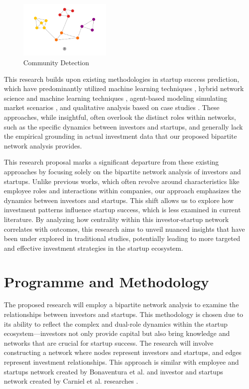 \documentclass[a4paper,11pt]{article}
\begin{document}
\begin{figure}[h]
\centering
\includegraphics[width=0.4\textwidth]{community.png}
\caption{Community Detection}
\end{figure}

This research builds upon existing methodologies in startup success prediction, which have predominantly utilized machine learning techniques \cite{krishna2016a} \cite{sharchilev2018a}, hybrid network science and machine learning techniques \cite{carniel2023a} \cite{yang2020a}, agent-based modeling simulating market scenarios \cite{lengyel2020a}, and qualitative analysis based on case studies \cite{mccarthy2023a}. These approaches, while insightful, often overlook the distinct roles within networks, such as the specific dynamics between investors and startups, and generally lack the empirical grounding in actual investment data that our proposed bipartite network analysis provides.

This research proposal marks a significant departure from these existing approaches by focusing solely on the bipartite network analysis of investors and startups. Unlike previous works, which often revolve around characteristics like employee roles and interactions within companies, our approach emphasizes the dynamics between investors and startups. This shift allows us to explore how investment patterns influence startup success, which is less examined in current literature. By analyzing how centrality within this investor-startup network correlates with outcomes, this research aims to unveil nuanced insights that have been under explored in traditional studies, potentially leading to more targeted and effective investment strategies in the startup ecosystem.

\section{Programme and Methodology}
The proposed research will employ a bipartite network analysis to examine the relationships between investors and startups. This methodology is chosen due to its ability to reflect the complex and dual-role dynamics within the startup ecosystem—investors not only provide capital but also bring knowledge and networks that are crucial for startup success. The research will involve constructing a network where nodes represent investors and startups, and edges represent investment relationships. This approach is similar with employee and startups network created by Bonaventura et al. \cite{bonaventura2020a} and investor and startups network created by Carniel et al. researches \cite{carniel2023a}.
\end{document}
